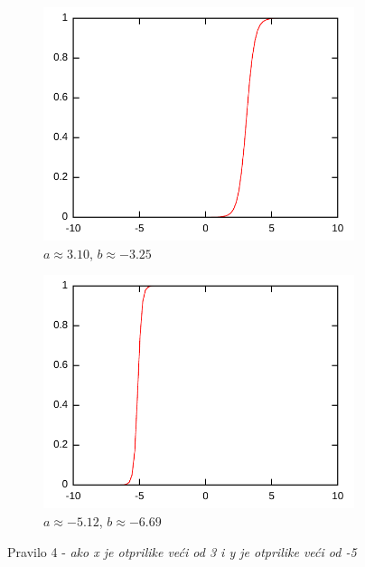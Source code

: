 \documentclass{article}
\begin{document}
\begin{figure}[h]
    \centering
    \begin{subfigure}[b]{0.49\textwidth}
        \centering
        \includegraphics[width=\textwidth]{img/rule-4-A.pdf}
        \caption{$ a \approx 3.10 $, $ b \approx -3.25 $}
    \end{subfigure}
    \hfill
    \begin{subfigure}[b]{0.49\textwidth}
        \centering
        \includegraphics[width=\textwidth]{img/rule-4-B.pdf}
        \caption{$ a \approx -5.12 $, $ b \approx -6.69 $}
    \end{subfigure}
    \hfill
    \caption{Pravilo 4 - \textit{ako x je otprilike veći od 3 i y je otprilike veći od -5}}
    \label{rule-4}
\end{figure}
\end{document}
